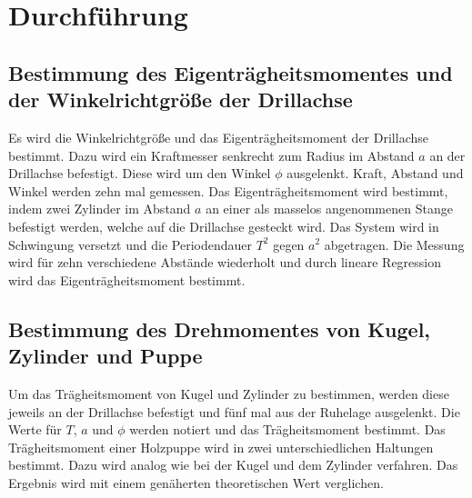 
\section{Durchführung}
\label{sec:Durchführung}

\subsection{Bestimmung des Eigenträgheitsmomentes und der Winkelrichtgröße der Drillachse}
Es wird die Winkelrichtgröße und das Eigenträgheitsmoment der Drillachse bestimmt. Dazu wird ein Kraftmesser senkrecht zum Radius im Abstand $a$ an der Drillachse befestigt. Diese wird um den Winkel $\phi$ ausgelenkt. Kraft, Abstand und Winkel werden zehn mal gemessen.\newline
Das Eigenträgheitsmoment wird bestimmt, indem zwei Zylinder im Abstand $a$ an einer als masselos angenommenen Stange befestigt werden, welche auf die Drillachse gesteckt wird. Das System wird in Schwingung versetzt und die Periodendauer $T^2$ gegen $a^2$ abgetragen. Die Messung wird für zehn verschiedene Abstände wiederholt und durch lineare Regression wird das Eigenträgheitsmoment bestimmt.   

\subsection{Bestimmung des Drehmomentes von Kugel, Zylinder und Puppe}
Um das Trägheitsmoment von Kugel und Zylinder zu bestimmen, werden diese jeweils an der Drillachse befestigt und fünf mal aus der Ruhelage ausgelenkt. Die Werte für $T$, $a$ und $\phi$ werden notiert und das Trägheitsmoment bestimmt. \newline
Das Trägheitsmoment einer Holzpuppe wird in zwei unterschiedlichen Haltungen bestimmt. Dazu wird analog wie bei der Kugel und dem Zylinder verfahren. Das Ergebnis wird mit einem genäherten theoretischen Wert verglichen.   